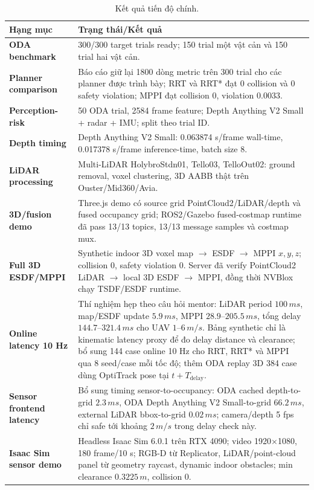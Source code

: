 \documentclass[10pt,a4paper]{article}
\begin{document}
\begin{table}[H]
\centering
\small
\caption{Kết quả tiến độ chính.}
\begin{tabularx}{0.98\linewidth}{>{\bfseries}p{3.5cm} X}
\toprule
Hạng mục & Trạng thái/Kết quả \\
\midrule
ODA benchmark & 300/300 target trials ready; 150 trial một vật cản và 150 trial hai vật cản. \\
Planner comparison & Báo cáo giữ lại 1800 dòng metric trên 300 trial cho các planner được trình bày; RRT và RRT* đạt 0 collision và 0 safety violation; MPPI đạt collision 0, violation 0.0033. \\
Perception-risk & 50 ODA trial, 2584 frame feature; Depth Anything V2 Small + radar + IMU; split theo trial ID. \\
Depth timing & Depth Anything V2 Small: 0.063874 s/frame wall-time, 0.017378 s/frame inference-time, batch size 8. \\
LiDAR processing & Multi-LiDAR HolybroStdn01, Tello03, TelloOut02: ground removal, voxel clustering, 3D AABB thật trên Ouster/Mid360/Avia. \\
3D/fusion demo & Three.js demo có source grid PointCloud2/LiDAR/depth và fused occupancy grid; ROS2/Gazebo fused-costmap runtime đã pass 13/13 topics, 13/13 message samples và costmap mux. \\
Full 3D ESDF/MPPI & Synthetic indoor 3D voxel map \(\rightarrow\) ESDF \(\rightarrow\) MPPI \(x,y,z\); collision 0, safety violation 0. Server đã verify PointCloud2 LiDAR \(\rightarrow\) local 3D ESDF \(\rightarrow\) MPPI, đồng thời NVBlox chạy TSDF/ESDF runtime. \\
Online latency 10 Hz & Thí nghiệm hẹp theo câu hỏi mentor: LiDAR period \(100\,ms\), map/ESDF update \(5.9\,ms\), MPPI \(28.9\)--\(205.5\,ms\), tổng delay \(144.7\)--\(321.4\,ms\) cho UAV \(1\)--\(6\,m/s\). Bảng synthetic chỉ là kinematic latency proxy để đo delay distance và clearance; bổ sung 144 case online 10 Hz cho RRT, RRT* và MPPI qua 8 seed/case mỗi tốc độ; thêm ODA replay 3D 384 case dùng OptiTrack pose tại \(t+T_{\mathrm{delay}}\). \\
Sensor frontend latency & Bổ sung timing sensor-to-occupancy: ODA cached depth-to-grid \(2.3\,ms\), ODA Depth Anything V2 Small-to-grid \(66.2\,ms\), external LiDAR bbox-to-grid \(0.02\,ms\); camera/depth 5 fps chỉ safe tới khoảng \(2\,m/s\) trong delay check này. \\
Isaac Sim sensor demo & Headless Isaac Sim 6.0.1 trên RTX 4090; video 1920\(\times\)1080, 180 frame/10 s; RGB-D từ Replicator, LiDAR/point-cloud panel từ geometry raycast, dynamic indoor obstacles; min clearance \(0.3225\,m\), collision 0. \\

\end{tabularx}
\end{table}
\end{document}
